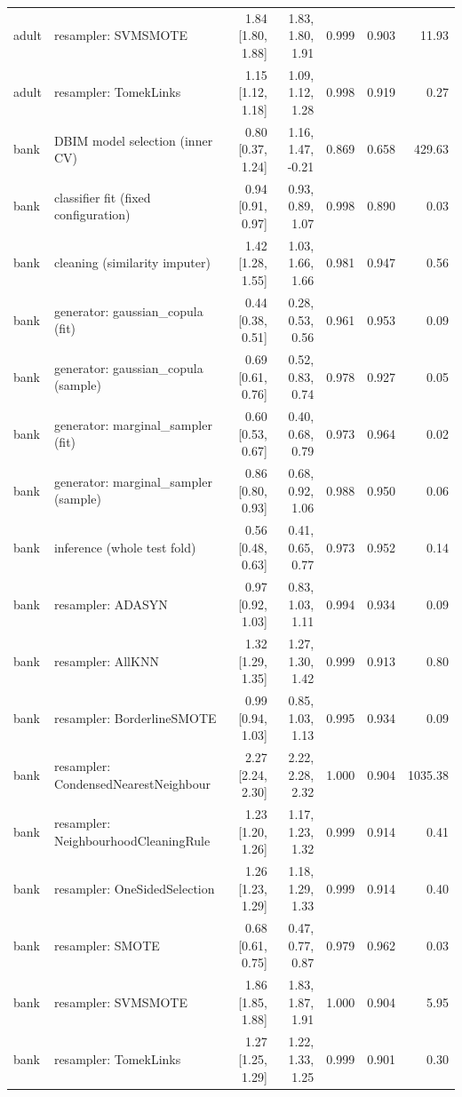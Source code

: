 \begin{table}[t]
{\begin{tabular}{llrrrrr}
adult & resampler: SVMSMOTE & 1.84 [1.80, 1.88] & 1.83, 1.80, 1.91 & 0.999 & 0.903 & 11.93 \\
adult & resampler: TomekLinks & 1.15 [1.12, 1.18] & 1.09, 1.12, 1.28 & 0.998 & 0.919 & 0.27 \\
bank & DBIM model selection (inner CV) & 0.80 [0.37, 1.24] & 1.16, 1.47, -0.21 & 0.869 & 0.658 & 429.63 \\
bank & classifier fit (fixed configuration) & 0.94 [0.91, 0.97] & 0.93, 0.89, 1.07 & 0.998 & 0.890 & 0.03 \\
bank & cleaning (similarity imputer) & 1.42 [1.28, 1.55] & 1.03, 1.66, 1.66 & 0.981 & 0.947 & 0.56 \\
bank & generator: gaussian\_copula (fit) & 0.44 [0.38, 0.51] & 0.28, 0.53, 0.56 & 0.961 & 0.953 & 0.09 \\
bank & generator: gaussian\_copula (sample) & 0.69 [0.61, 0.76] & 0.52, 0.83, 0.74 & 0.978 & 0.927 & 0.05 \\
bank & generator: marginal\_sampler (fit) & 0.60 [0.53, 0.67] & 0.40, 0.68, 0.79 & 0.973 & 0.964 & 0.02 \\
bank & generator: marginal\_sampler (sample) & 0.86 [0.80, 0.93] & 0.68, 0.92, 1.06 & 0.988 & 0.950 & 0.06 \\
bank & inference (whole test fold) & 0.56 [0.48, 0.63] & 0.41, 0.65, 0.77 & 0.973 & 0.952 & 0.14 \\
bank & resampler: ADASYN & 0.97 [0.92, 1.03] & 0.83, 1.03, 1.11 & 0.994 & 0.934 & 0.09 \\
bank & resampler: AllKNN & 1.32 [1.29, 1.35] & 1.27, 1.30, 1.42 & 0.999 & 0.913 & 0.80 \\
bank & resampler: BorderlineSMOTE & 0.99 [0.94, 1.03] & 0.85, 1.03, 1.13 & 0.995 & 0.934 & 0.09 \\
bank & resampler: CondensedNearestNeighbour & 2.27 [2.24, 2.30] & 2.22, 2.28, 2.32 & 1.000 & 0.904 & 1035.38 \\
bank & resampler: NeighbourhoodCleaningRule & 1.23 [1.20, 1.26] & 1.17, 1.23, 1.32 & 0.999 & 0.914 & 0.41 \\
bank & resampler: OneSidedSelection & 1.26 [1.23, 1.29] & 1.18, 1.29, 1.33 & 0.999 & 0.914 & 0.40 \\
bank & resampler: SMOTE & 0.68 [0.61, 0.75] & 0.47, 0.77, 0.87 & 0.979 & 0.962 & 0.03 \\
bank & resampler: SVMSMOTE & 1.86 [1.85, 1.88] & 1.83, 1.87, 1.91 & 1.000 & 0.904 & 5.95 \\
bank & resampler: TomekLinks & 1.27 [1.25, 1.29] & 1.22, 1.33, 1.25 & 0.999 & 0.901 & 0.30 \\
\bottomrule
\end{tabular}}
\end{table}
